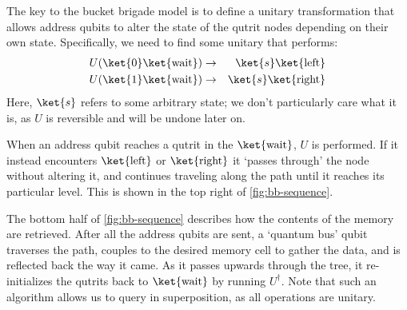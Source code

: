 \documentclass[a4paper,12pt]{article}
\begin{document}
The key to the bucket brigade model is to define a unitary transformation that allows address qubits to alter the state of the qutrit nodes depending on their own state. 
Specifically, we need to find some unitary that performs:
\begin{eqnarray}
 U(\ket{0}\ket{\hbox{wait}}) &\rightarrow& \ket{s}\ket{\hbox{left}} \\
 U(\ket{1}\ket{\hbox{wait}}) &\rightarrow& \ket{s}\ket{\hbox{right}}
\end{eqnarray}
Here, $\ket{s}$ refers to some arbitrary state; we don't particularly care what it is, as $U$ is reversible and will be undone later on.

When an address qubit reaches a qutrit in the $\ket{\hbox{wait}}$, $U$ is performed. 
If it instead encounters $\ket{\hbox{left}}$ or $\ket{\hbox{right}}$ it `passes through' the node without altering it, and continues traveling along the path until it reaches its particular level. 
This is shown in the top right of \autoref{fig:bb-sequence}.

The bottom half of \autoref{fig:bb-sequence} describes how the contents of the memory are retrieved. 
After all the address qubits are sent, a `quantum bus' qubit traverses the path, couples to the desired memory cell to gather the data, and is reflected back the way it came. 
As it passes upwards through the tree, it re-initializes the qutrits back to $\ket{\hbox{wait}}$ by running $U^\dag$. 
Note that such an algorithm allows us to query in superposition, as all operations are unitary.
\end{document}
